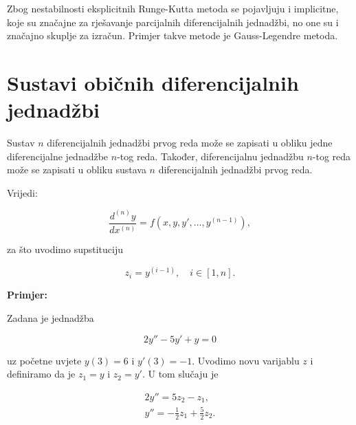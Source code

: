 Zbog nestabilnosti eksplicitnih Runge-Kutta metoda se pojavljuju i implicitne,
koje su značajne za rješavanje parcijalnih diferencijalnih jednadžbi, no one su
i značajno skuplje za izračun. Primjer takve metode je Gauss-Legendre metoda.

\section{Sustavi običnih diferencijalnih jednadžbi}

Sustav $n$ diferencijalnih jednadžbi prvog reda može se zapisati u obliku jedne
diferencijalne jednadžbe $n$-tog reda. Također, diferencijalnu jednadžbu $n$-tog
reda može se zapisati u obliku sustava $n$ diferencijalnih jednadžbi prvog reda.

Vrijedi:

$$
\dfrac{d^{(n)}y}{dx^{(n)}} = f(x, y, y', \dots, y^{(n-1)}),
$$

za što uvodimo supstituciju

$$
    z_i = y^{(i-1)},\quad i \in [1, n].
$$

\textbf{Primjer:}

Zadana je jednadžba

$$
2y''-5y'+y=0
$$

uz početne uvjete $y(3)=6$ i $y'(3)=-1$. Uvodimo novu varijablu $z$ i definiramo
da je $z_1=y$ i $z_2=y'$. U tom slučaju je

\begin{gather*}
    2y''=5z_2 - z_1,\\
    y''=-\frac{1}{2}z_1+\frac{5}{2}z_2.
\end{gather*}
